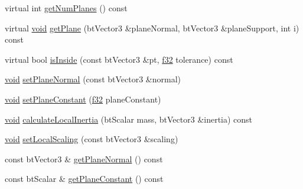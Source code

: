 \begin{DoxyCompactItemize}
virtual int \mbox{\hyperlink{classnjli_1_1_physics_shape_static_plane_a7602280dd520ca98ec426278cb8e3681}{get\+Num\+Planes}} () const
\item 
virtual \mbox{\hyperlink{_thread_8h_af1e856da2e658414cb2456cb6f7ebc66}{void}} \mbox{\hyperlink{classnjli_1_1_physics_shape_static_plane_afaceeca4c3253774f92b2d67e6696b1e}{get\+Plane}} (bt\+Vector3 \&plane\+Normal, bt\+Vector3 \&plane\+Support, int i) const
\item 
virtual bool \mbox{\hyperlink{classnjli_1_1_physics_shape_static_plane_abee3513f871d8a14e23d06e6cdc5827a}{is\+Inside}} (const bt\+Vector3 \&pt, \mbox{\hyperlink{_util_8h_a5f6906312a689f27d70e9d086649d3fd}{f32}} tolerance) const
\item 
\mbox{\hyperlink{_thread_8h_af1e856da2e658414cb2456cb6f7ebc66}{void}} \mbox{\hyperlink{classnjli_1_1_physics_shape_static_plane_a351f9c4734b51edef978bea4598d1c16}{set\+Plane\+Normal}} (const bt\+Vector3 \&normal)
\item 
\mbox{\hyperlink{_thread_8h_af1e856da2e658414cb2456cb6f7ebc66}{void}} \mbox{\hyperlink{classnjli_1_1_physics_shape_static_plane_a046e8fdb529ee0d0ec14c81cba9c58bc}{set\+Plane\+Constant}} (\mbox{\hyperlink{_util_8h_a5f6906312a689f27d70e9d086649d3fd}{f32}} plane\+Constant)
\item 
\mbox{\hyperlink{_thread_8h_af1e856da2e658414cb2456cb6f7ebc66}{void}} \mbox{\hyperlink{classnjli_1_1_physics_shape_static_plane_adf9dfae5f28e8d2dcd0480e698cd4522}{calculate\+Local\+Inertia}} (bt\+Scalar mass, bt\+Vector3 \&inertia) const
\item 
\mbox{\hyperlink{_thread_8h_af1e856da2e658414cb2456cb6f7ebc66}{void}} \mbox{\hyperlink{classnjli_1_1_physics_shape_static_plane_a2f6934822e6cfe1e4653809231fb4218}{set\+Local\+Scaling}} (const bt\+Vector3 \&scaling)
\item 
const bt\+Vector3 \& \mbox{\hyperlink{classnjli_1_1_physics_shape_static_plane_af5e3847eaaa60ba5f46336fef66220b6}{get\+Plane\+Normal}} () const
\item 
const bt\+Scalar \& \mbox{\hyperlink{classnjli_1_1_physics_shape_static_plane_a09460db70d98e4bf1bec7b945bcb0e9c}{get\+Plane\+Constant}} () const
\end{DoxyCompactItemize}
